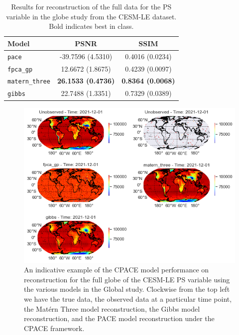 \begin{table}
	\caption[Results for PS variable on full data in the Globe study]{Results for reconstruction of the full data for the PS variable in the globe study from the CESM-LE dataset. Bold indicates best in class.}
	\centering
	\label{tab:full_cesm_ps_globe}
	\begin{tabular}{lcc}
		\toprule
		\textbf{Model} & \textbf{PSNR} & \textbf{SSIM} \\
		\midrule
		\verb*|pace| & -39.7596 (4.5310) & 0.4016	(0.0234) \\
		\verb*|fpca_gp| & 12.6672 (1.8675) & 0.4239 (0.0097) \\
		\verb*|matern_three| & \textbf{26.1533	(0.4736)} & \textbf{0.8364 (0.0068)}\\
		\verb*|gibbs| & 22.7488 (1.3351) & 0.7329	(0.0389)\\
		\bottomrule
	\end{tabular}
\end{table}

\begin{figure}
	\centering
	\includegraphics[width=\textwidth]{full_ex_ps_globe}
	\caption{An indicative example of the CPACE model performance on reconstruction for the full globe of the CESM-LE PS variable using the various models in the Global study. Clockwise from the top left we have the true data, the observed data at a particular time point, the Mat\'ern Three model reconstruction, the Gibbs model reconstruction, and the PACE model reconstruction under the CPACE framework.}
	\label{fig:full_ex_ps_globe}
\end{figure}

